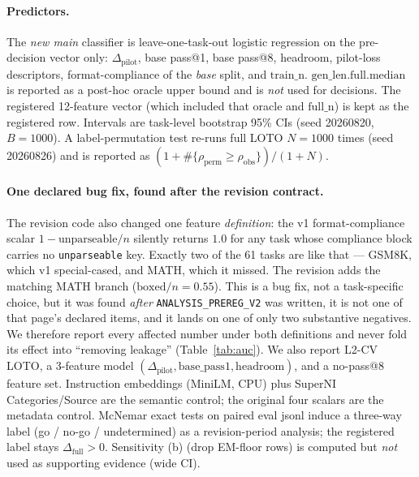 \paragraph{Predictors.}
The \emph{new main} classifier is leave-one-task-out logistic
regression on the pre-decision vector only:
$\Delta_{\mathrm{pilot}}$, base pass@1, base pass@8, headroom,
pilot-loss descriptors, format-compliance of the \emph{base}
split, and $\mathrm{train\_n}$.
$\mathrm{gen\_len.full.median}$ is reported as a post-hoc oracle
upper bound and is \emph{not} used for decisions.
The registered 12-feature vector (which included that oracle and
$\mathrm{full\_n}$) is kept as the registered row.
Intervals are task-level bootstrap 95\% CIs (seed 20260820, $B{=}1000$).
A label-permutation test re-runs full LOTO $N{=}1000$ times
(seed 20260826) and is reported as
$(1+\#\{\rho_{\mathrm{perm}}\ge\rho_{\mathrm{obs}}\})/(1+N)$.

\paragraph{One declared bug fix, found after the revision contract.}
The revision code also changed one feature \emph{definition}: the
v1 format-compliance scalar $1-\mathrm{unparseable}/n$ silently
returns $1.0$ for any task whose compliance block carries no
\texttt{unparseable} key. Exactly two of the 61 tasks are like
that --- GSM8K, which v1 special-cased, and MATH, which it missed.
The revision adds the matching MATH branch
($\mathrm{boxed}/n=0.55$).
This is a bug fix, not a task-specific choice, but it was found
\emph{after} \texttt{ANALYSIS\_PREREG\_V2} was written, it is not
one of that page's declared items, and it lands on one of only two
substantive negatives. We therefore report every affected number
under both definitions and never fold its effect into
``removing leakage'' (Table~\ref{tab:auc}).
We also report L2-CV LOTO, a 3-feature model
$(\Delta_{\mathrm{pilot}}, \mathrm{base\_pass1}, \mathrm{headroom})$,
and a no-pass@8 feature set.
Instruction embeddings (MiniLM, CPU) plus SuperNI
Categories/Source are the semantic control; the original four
scalars are the metadata control.
McNemar exact tests on paired eval jsonl induce a three-way label
(go / no-go / undetermined) as a revision-period analysis; the
registered label stays $\Delta_{\mathrm{full}}>0$.
Sensitivity (b) (drop EM-floor rows) is computed but \emph{not}
used as supporting evidence (wide CI).

